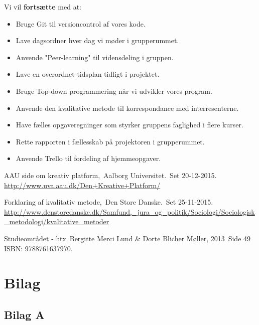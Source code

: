 \documentclass[oneside,a4paper,titlepage]{article}
\begin{document}
Vi vil \textbf{fortsætte} med at:
\begin{itemize}
  \item Bruge Git til versioncontrol af vores kode.
  \item Lave dagsordner hver dag vi møder i grupperummet.
  \item Anvende "Peer-learning" til vidensdeling i gruppen. 
  \item Lave en overordnet tidsplan tidligt i projektet. 
  \item Bruge Top-down programmering når vi udvikler vores program.
  \item Anvende den kvalitative metode til korrespondance med interresenterne. 
  \item Have fælles opgaveregninger som styrker gruppens faglighed i flere kurser.
  \item Rette rapporten i fællesskab på projektoren i grupperummet.
  \item Anvende Trello til fordeling af hjemmeopgaver.
\end{itemize}

\begin{thebibliography}{99}
  AAU side om kreativ platform,\
  Aalborg Universitet.\
  Set 20-12-2015.\\
  \url{http://www.uva.aau.dk/Den+Kreative+Platform/}

  Forklaring af kvalitativ metode,\
  Den Store Danske.\
  Set 25-11-2015.\\
  \url{http://www.denstoredanske.dk/Samfund,_jura_og_politik/Sociologi/Sociologisk_metodologi/kvalitative_metoder}

\bibitem{SO_bog}  
  Studieområdet - htx\
  Bergitte Merci Lund \& Dorte Blicher Møller, 2013\
  Side 49\\
  ISBN: 9788761637970.
  
\end{thebibliography}

\section{Bilag}

\subsection{Bilag A}
\end{document}
